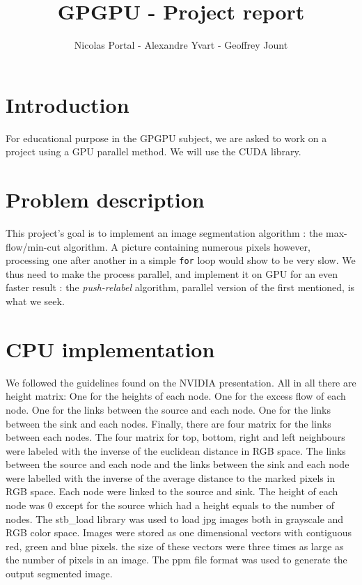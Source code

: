 \documentclass{article}
\title{GPGPU - Project report}
\author{Nicolas Portal - Alexandre Yvart - Geoffrey Jount}
\begin{document}
\maketitle


\pagebreak
\tableofcontents


\pagebreak
{}

\section{Introduction}

For educational purpose in the GPGPU subject, we are asked to work on a project
using a GPU parallel method. We will use the CUDA library.

\section{Problem description}

This project's goal is to implement an image segmentation algorithm :
the max-flow/min-cut algorithm. A picture containing numerous pixels however,
processing one after another in a simple \texttt{for} loop would show to be
very slow. We thus need to make the process parallel, and implement it on GPU
for an even faster result : the \textit{push-relabel} algorithm, parallel
version of the first mentioned, is what we seek.

\section{CPU implementation}

We followed the guidelines found on the NVIDIA presentation. All in all there are height matrix: One for the heights of each node. One for the excess flow of each node. One for the links between the source and each node. One for the links between the sink and each nodes. Finally, there are four matrix for the links between each nodes. The four matrix for top, bottom, right and left neighbours were labeled with the inverse of the euclidean distance in RGB space. The links between the source and each node and the links between the sink and each node were labelled with the inverse of the average distance to the marked pixels in RGB space. Each node were linked to the source and sink. The height of each node was 0 except for the source which had a height equals to the number of nodes. The stb_load library was used to load jpg images both in grayscale and RGB color space. Images were stored as one dimensional vectors with contiguous red, green and blue pixels. the size of these vectors were three times as large as the number of pixels in an image. The ppm file format was used to generate the output segmented image.
\end{document}
